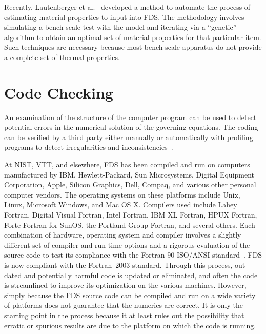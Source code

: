 \documentclass[11pt]{book}
\begin{document}
Recently, Lautenberger et al.~\cite{Lautenberger:FSJ} developed a method to automate the
process of  estimating material properties to input  into FDS. The methodology involves simulating a  bench-scale test with the model and iterating
via a ``genetic'' algorithm  to obtain  an  optimal set  of material  properties for  that  particular item.  Such techniques  are necessary because
most bench-scale apparatus do not provide a complete set of thermal properties.



\section{Code Checking}
\label{Code Checking}

An examination of the structure of the computer program can be used to detect potential errors in the numerical solution of the governing equations.
The coding can be verified by a third party either manually or automatically with profiling programs to detect irregularities and
inconsistencies~\cite{ASTM:E1355}.

At NIST, VTT, and elsewhere, FDS has been compiled and run on computers manufactured by IBM, Hewlett-Packard, Sun Microsystems, Digital Equipment
Corporation, Apple, Silicon Graphics, Dell, Compaq, and various other personal computer vendors. The operating systems on these platforms include
Unix, Linux, Microsoft Windows, and Mac OS X. Compilers used include Lahey Fortran, Digital Visual Fortran, Intel Fortran, IBM XL Fortran, HPUX
Fortran, Forte Fortran for SunOS, the Portland Group Fortran, and several others. Each combination of hardware, operating system and compiler
involves a slightly different set of compiler and run-time options and a rigorous evaluation of the source code to test its compliance with the
Fortran 90 ISO/ANSI standard~\cite{F90}. FDS is now compliant with the Fortran~2003 standard. Through this process, out-dated and potentially harmful code is updated or eliminated, and often the code is
streamlined to improve its optimization on the various machines. However, simply because the FDS source code can be compiled and run on a wide
variety of platforms does not guarantee that the numerics are correct. It is only the starting point in the process because it at least rules out the
possibility that erratic or spurious results are due to the platform on which the code is running.
\end{document}
